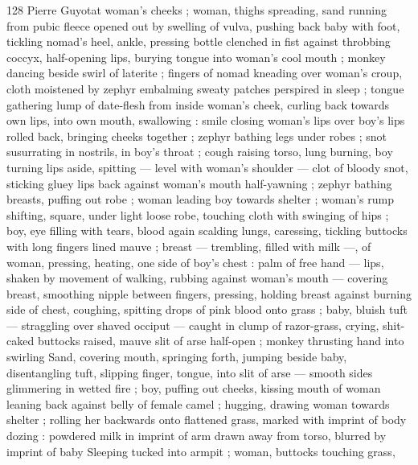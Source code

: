 128 Pierre Guyotat
woman's cheeks ; woman, thighs spreading, sand running from pubic
fleece opened out by swelling of vulva, pushing back baby with foot,
tickling nomad’s heel, ankle, pressing bottle clenched in fist against
throbbing coccyx, half-opening lips, burying tongue into woman's
cool mouth ; monkey dancing beside swirl of laterite ; fingers of
nomad kneading over woman's croup, cloth moistened by zephyr
embalming sweaty patches perspired in sleep ; tongue gathering
lump of date-flesh from inside woman's cheek, curling back towards
own lips, into own mouth, swallowing : smile closing woman's lips
over boy's lips rolled back, bringing cheeks together ; zephyr bathing
legs under robes ; snot susurrating in nostrils, in boy's throat ; cough
raising torso, lung burning, boy turning lips aside, spitting — level
with woman's shoulder — clot of bloody snot, sticking gluey lips
back against woman's mouth half-yawning ; zephyr bathing breasts,
puffing out robe ; woman leading boy towards shelter ; woman's
rump shifting, square, under light loose robe, touching cloth with
swinging of hips ; boy, eye filling with tears, blood again scalding
lungs, caressing, tickling buttocks with long fingers lined mauve ;
breast — trembling, filled with milk —, of woman, pressing, heating,
one side of boy's chest : palm of free hand — lips, shaken by
movement of walking, rubbing against woman's mouth — covering
breast, smoothing nipple between fingers, pressing, holding breast
against burning side of chest, coughing, spitting drops of pink blood
onto grass ; baby, bluish tuft — straggling over shaved occiput —
caught in clump of razor-grass, crying, shit-caked buttocks raised,
mauve slit of arse half-open ; monkey thrusting hand into swirling
Sand, covering mouth, springing forth, jumping beside baby,
disentangling tuft, slipping finger, tongue, into slit of arse — smooth
sides glimmering in wetted fire ; boy, puffing out cheeks, kissing
mouth of woman leaning back against belly of female camel ;
hugging, drawing woman towards shelter ; rolling her backwards onto
flattened grass, marked with imprint of body dozing : powdered milk
in imprint of arm drawn away from torso, blurred by imprint of baby
Sleeping tucked into armpit ; woman, buttocks touching grass,

